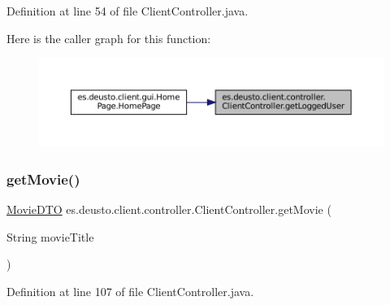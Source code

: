 Definition at line 54 of file Client\+Controller.\+java.

Here is the caller graph for this function\+:
\nopagebreak
\begin{figure}[H]
\begin{center}
\leavevmode
\includegraphics[width=350pt]{classes_1_1deusto_1_1client_1_1controller_1_1_client_controller_ac9d06db0017e2f06d06e8669398118f4_icgraph}
\end{center}
\end{figure}
\mbox{\label{classes_1_1deusto_1_1client_1_1controller_1_1_client_controller_ae371135958d6f88011239d360d936ada}} 
\subsubsection{\texorpdfstring{getMovie()}{getMovie()}}
{\footnotesize\ttfamily \mbox{\hyperlink{classes_1_1deusto_1_1server_1_1data_1_1_movie_d_t_o}{Movie\+D\+TO}} es.\+deusto.\+client.\+controller.\+Client\+Controller.\+get\+Movie (\begin{DoxyParamCaption}\item[{String}]{movie\+Title }\end{DoxyParamCaption})}



Definition at line 107 of file Client\+Controller.\+java.

